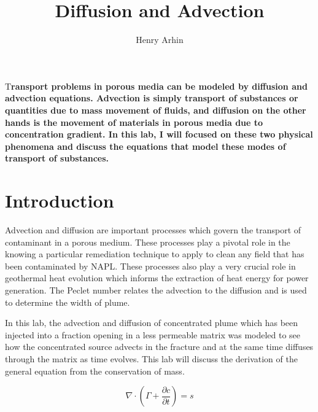 \documentclass[DIV=calc, paper=a4, fontsize=11pt, twocolumn]{scrartcl}	 %
\title{Diffusion and Advection}
\author{Henry Arhin }
\date{} %
\newcommand{\initial}[1]{ %
\lettrine[lines=3,lhang=0.3,nindent=0em]{
\color{DarkGoldenrod}
{\textsf{#1}}}{}}
\begin{document}
\maketitle %

\thispagestyle{empty} %


\initial{T}\textbf{ransport problems in porous media can be modeled by diffusion and advection equations. Advection is simply transport of substances or quantities due to mass movement of fluids, and diffusion on the other hands is the movement of materials in porous media due to concentration gradient. In this lab, I will focused on these two physical phenomena and discuss the equations that model these modes of transport of substances.}


\section*{Introduction}

Advection and diffusion are important processes which govern the transport of contaminant in a porous medium. These processes play a pivotal role in the knowing a particular remediation technique to apply to clean any field that has been contaminated by NAPL. These processes also play a very crucial role in geothermal heat evolution which informs the extraction of heat energy for power generation. The Peclet number relates the advection to the diffusion and is used to determine the width of plume. 

In this lab, the advection and diffusion of concentrated plume which has been injected into a fraction opening in a less permeable matrix was modeled to see how the concentrated source advects in the fracture and at the same time diffuses through the matrix as time evolves.
This lab will discuss the derivation of the general equation from the conservation of mass.

\begin{equation}
    \nabla \cdot (\Gamma + \frac{\partial c}{\partial t}) = s
\end{equation}
\end{document}
